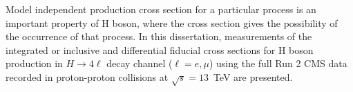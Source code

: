 \par 
Model independent production cross section for a particular process is an important property of H boson, where the cross section gives the possibility of the occurrence of that process.  In this dissertation, measurements of the integrated or inclusive and differential fiducial cross sections for H boson production in $H \rightarrow 4\ell$ decay channel ($\ell = e, \mu$) using the full Run 2 CMS data recorded in proton-proton collisions at $\sqrt{s}=13$~TeV are presented. 
